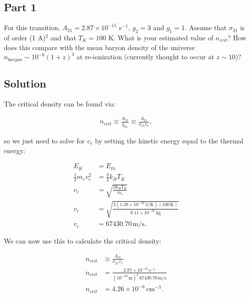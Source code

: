 \documentclass[12pt]{article}
\begin{document}

\subsection*{Part 1}


For this transition, $A_{21} = 2.87 \times 10^{-15}$ s$^{-1}$, $g_2=3$ and $g_1=1$. Assume that $\sigma_{21}$ is of order (1 A)$^2$ and that $T_K=100$ K. What is your estimated value of $n_{crit}$? How does this compare with the mean baryon density of the universe $n_{baryon} \sim 10^{−6}(1+z)^3$ at re-ionization (currently thought to occur at $z \sim 10$)?


\subsection*{Solution}

The critical density can be found via:

\begin{align*}
n_{crit} \equiv \frac{A_{21}}{q_{21}} \equiv \frac{A_{21}}{\sigma_{21}v_e},
\end{align*}

so we just need to solve for $v_e$ by setting the kinetic energy equal to the thermal energy:

\begin{equation*}
\begin{split}
E_K &= E_{th}\\
\frac{1}{2}m_ev_e^2 &= \frac{3}{2}k_BT_K\\
v_e &= \sqrt{\frac{3k_BT_K}{m_e}}\\
v_e &= \sqrt{\frac{3(1.38\times10^{-23}\,\mathrm{J/K})(100\,\mathrm{K})}{9.11\times10^{-31}\,\mathrm{kg}}}\\
v_e &= 67430.70 \, \mathrm{m/s}.
\end{split}
\end{equation*}

We can now use this to calculate the critical density:

\begin{equation*}
\begin{split}
n_{crit} &\equiv \frac{A_{21}}{\sigma_{21}v_e}\\
n_{crit} &= \frac{2.87 \times 10^{-15}\,\mathrm{s}^{-1}}{(10^{-10}\,\mathrm{m})^2\,67430.70\,\mathrm{m/s}}\\
n_{crit} &= 4.26\times10^{-6}\,\mathrm{cm^{-3}}.
\end{split}
\end{equation*}
\end{document}

